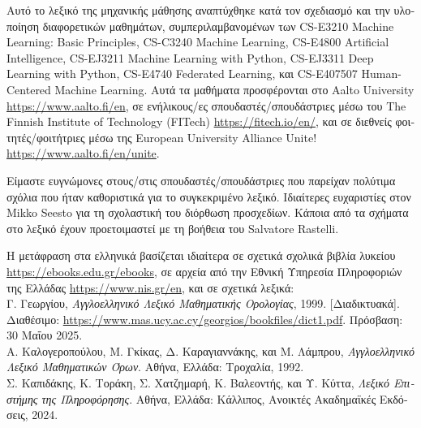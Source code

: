 \documentclass[journal,12pt,onecolumn]{article}
\begin{document}
\noindent \foreignlanguage{greek}{Αυτό το λεξικό της μηχανικής μάθησης αναπτύχθηκε κατά τον σχεδιασμό
και την υλοποίηση διαφορετικών μαθημάτων, συμπεριλαμβανομένων των} CS-E3210 Machine Learning: 
Basic Principles, CS-C3240 Machine Learning, CS-E4800 Artificial Intelligence, CS-EJ3211 Machine Learning with 
Python, CS-EJ3311 Deep Learning with Python, CS-E4740 Federated Learning,
\foreignlanguage{greek}{και} CS-E407507 Human-Centered Machine Learning. \foreignlanguage{greek}{Αυτά τα 
μαθήματα προσφέρονται στο} Aalto University \url{https://www.aalto.fi/en}, \foreignlanguage{greek}{σε 
ενήλικους/ες σπουδαστές/σπουδάστριες μέσω του} The Finnish Institute of Technology (FITech) 
\url{https://fitech.io/en/}, \foreignlanguage{greek}{και σε διεθνείς φοιτητές/φοιτήτριες μέσω της} 
European University Alliance Unite! \url{https://www.aalto.fi/en/unite}.

\noindent \foreignlanguage{greek}{Είμαστε ευγνώμονες στους/στις σπουδαστές/σπουδάστριες που παρείχαν 
πολύτιμα σχόλια που ήταν καθοριστικά για το συγκεκριμένο λεξικό. Ιδιαίτερες ευχαριστίες στον} Mikko 
Seesto \foreignlanguage{greek}{για τη σχολαστική του διόρθωση προσχεδίων. Κάποια από τα σχήματα στο
λεξικό έχουν προετοιμαστεί με τη βοήθεια του} Salvatore Rastelli.

\noindent \foreignlanguage{greek}{Η μετάφραση στα ελληνικά βασίζεται ιδιαίτερα σε σχετικά σχολικά βιβλία λυκείου} 
\url{https://ebooks.edu.gr/ebooks}, 
\foreignlanguage{greek}{σε αρχεία από την Εθνική Υπηρεσία Πληροφοριών της Ελλάδας} \url{https://www.nis.gr/en}, 
\foreignlanguage{greek}{και σε σχετικά λεξικά:} \\
\foreignlanguage{greek}{Γ. Γεωργίου}, \textit{\foreignlanguage{greek}{Αγγλοελληνικό Λεξικό Μαθηματικής Ορολογίας}}, 
1999. \foreignlanguage{greek}{[Διαδικτυακά]. Διαθέσιμο:} \url{https://www.mas.ucy.ac.cy/georgios/bookfiles/dict1.pdf}. 
\foreignlanguage{greek}{Πρόσβαση: 30 Μαΐου 2025.}\\
\foreignlanguage{greek}{Α. Καλογεροπούλου, Μ. Γκίκας, Δ. Καραγιαννάκης, και Μ. Λάμπρου}, 
\textit{\foreignlanguage{greek}{Αγγλοελληνικό Λεξικό Μαθηματικών Όρων}}. \foreignlanguage{greek}{Αθήνα, Ελλάδα: Τροχαλία, 1992.}\\
\foreignlanguage{greek}{Σ. Καπιδάκης, Κ. Τοράκη, Σ. Χατζημαρή, Κ. Βαλεοντής, και Υ. Κύττα}, 
\textit{\foreignlanguage{greek}{Λεξικό Επιστήμης της Πληροφόρησης}}. \foreignlanguage{greek}{Αθήνα, Ελλάδα: Κάλλιπος, 
Ανοικτές Ακαδημαϊκές Εκδόσεις, 2024.}



\newpage 

\end{document}
